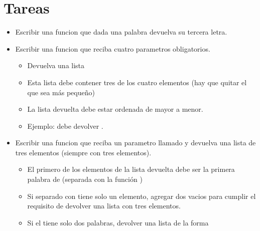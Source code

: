 \documentclass[a4paper,12pt,spanish]{sphinxmanual}
\begin{document}
\section{Tareas}
\label{\detokenize{list:tareas}}\begin{itemize}
\item {} 
\sphinxAtStartPar
Escribir una funcion que dada una palabra devuelva su tercera letra.

\item {} 
\sphinxAtStartPar
Escribir una funcion que reciba cuatro parametros obligatorios.
\begin{itemize}
\item {} 
\sphinxAtStartPar
Devuelva una lista

\item {} 
\sphinxAtStartPar
Esta lista debe contener tres de los cuatro elementos (hay que quitar el que sea más pequeño)

\item {} 
\sphinxAtStartPar
La lista devuelta debe estar ordenada de mayor a menor.

\item {} 
\sphinxAtStartPar
Ejemplo:  debe devolver \sphinxcode{\sphinxupquote{{[}12, 9, 8{]}}}.

\end{itemize}

\item {} 
\sphinxAtStartPar
Escribir una funcion que reciba un parametro llamado  y devuelva una
lista de tres elementos (siempre con tres elementos).
\begin{itemize}
\item {} 
\sphinxAtStartPar
El primero de los elementos de la lista devuelta debe ser la primera
palabra de  (separada con la función )

\item {} 
\sphinxAtStartPar
Si  separado con  tiene solo un elemento,
agregar dos  vacios para cumplir el requisito de devolver una
lista con tres elementos.

\item {} 
\sphinxAtStartPar
Si el  tiene solo dos palabras, devolver una lista de la
forma 


\end{itemize}
\end{itemize}
\end{document}
